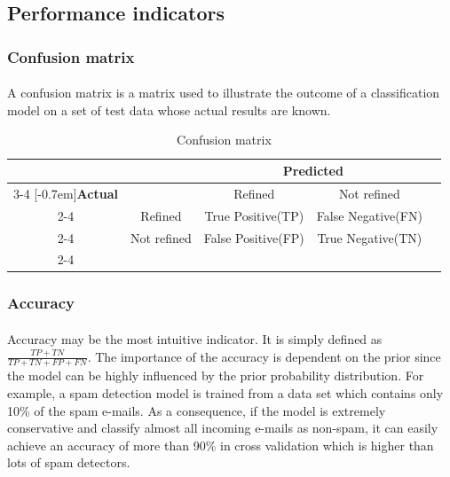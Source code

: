 
\subsection{Performance indicators}
\label{lr_ml:indicators}
\subsubsection{Confusion matrix}
\paragraph{}
A confusion matrix is a matrix used to illustrate the outcome of a classification model on a set of test data whose actual results are known.
    \begin{table}[]
        \centering
        \caption{Confusion matrix}
        \label{my-label}
        \begin{tabular}{ccccc}
                                & & \multicolumn{2}{c}{\textbf{Predicted}}                 &  \\ \cline{3-4}
                                \multirow{3}{*}[-0.7em]{\textbf{Actual}} &
                                & \multicolumn{1}{|c|}{Refined}        & \multicolumn{1}{c|}{Not refined}    &  \\ \cline{2-4}        
                                & \multicolumn{1}{|c}{Refined}     & \multicolumn{1}{|c|}{True Positive(TP)}  & \multicolumn{1}{c|}{False Negative(FN)} &  \\ \cline{2-4}
                                & \multicolumn{1}{|c}{Not refined} & \multicolumn{1}{|c|}{False Positive(FP)} & \multicolumn{1}{c|}{True Negative(TN)}  &  \\ \cline{2-4}
        \end{tabular}
    \end{table}
%
\subsubsection{Accuracy}
\paragraph{}
Accuracy may be the most intuitive indicator.
It is simply defined as $\frac{TP+TN}{TP+TN+FP+FN}$.
The importance of the accuracy is dependent on the prior since the model can be highly influenced by the prior probability distribution.
For example, a spam detection model is trained from a data set which contains only 10\% of the spam e-mails.
As a consequence, if the model is extremely conservative and classify almost all incoming e-mails as non-spam, it can easily achieve an accuracy of more than 90\% in cross validation which is higher than lots of spam detectors.

